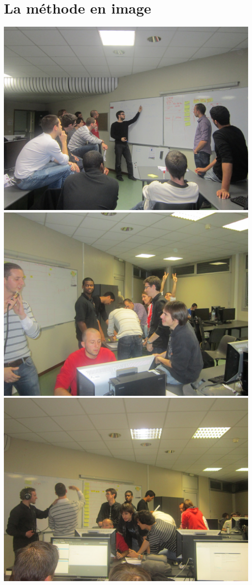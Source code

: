 \documentclass[a4paper,francais,titlepage]{article}
\begin{document}
\section{La méthode en image}
   	\includegraphics[scale=0.378]{brainstorming7.jpeg} \hspace{0.3cm} \includegraphics[scale=0.378]{brainstorming4.jpeg} \hspace{0.3cm} \includegraphics[scale=0.38]{brainstorming5.jpeg} \\
\end{document}
